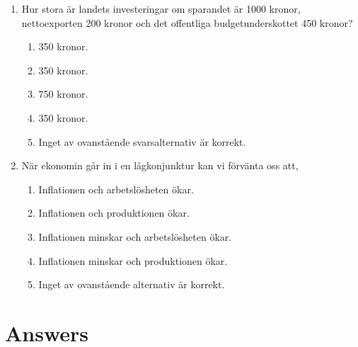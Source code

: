 \documentclass[12pt,a4paper]{article}
\begin{document}
\begin{enumerate}[label=\arabic*.]
    \item Hur stora är landets investeringar om sparandet är 1000 kronor, nettoexporten 200 kronor och det offentliga budgetunderskottet 450 kronor?
    \begin{enumerate}[label=\Alph*.]
        \item 350 kronor.
        \item 350 kronor.
        \item 750 kronor.
        \item 350 kronor.
        \item Inget av ovanstående svarsalternativ är korrekt.
    \end{enumerate}

    \item När ekonomin går in i en lågkonjunktur kan vi förvänta oss att,
    \begin{enumerate}[label=\Alph*.]
        \item Inflationen och arbetslösheten ökar.
        \item Inflationen och produktionen ökar.
        \item Inflationen minskar och arbetslösheten ökar.
        \item Inflationen minskar och produktionen ökar.
        \item Inget av ovanstående alternativ är korrekt.
    \end{enumerate}

\end{enumerate}

\newpage
\section*{Answers}
\end{document}
